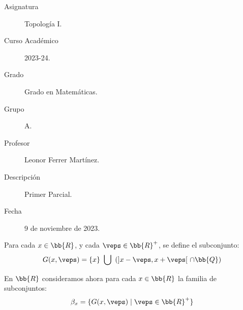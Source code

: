 \documentclass[12pt]{article}
\begin{document}

    
    

    \begin{description}
        \item[Asignatura] Topología I.
        \item[Curso Académico] 2023-24.
        \item[Grado] Grado en Matemáticas.
        \item[Grupo] A.
        \item[Profesor] Leonor Ferrer Martínez.
        \item[Descripción] Primer Parcial.
        \item[Fecha] 9 de noviembre de 2023.
    
    \end{description}
    \newpage
    
    Para cada $x\in \bb{R}$, y cada $\veps\in \bb{R}^+$, se define
    el subconjunto:
    \begin{equation*}
        G(x,\veps) = \{x\} ~\bigcup~ \left(]x-\veps, x+\veps[~\cap \bb{Q}\right)
    \end{equation*}

    En $\bb{R}$ consideramos ahora para cada $x\in \bb{R}$ la familia de subconjuntos:
    \begin{equation*}
        \beta_x = \{G(x,\veps) \mid \veps\in \bb{R}^+\}
    \end{equation*}
    
\end{document}
